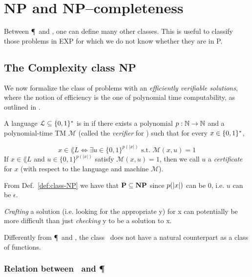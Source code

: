 \chapter{NP and NP--completeness}\label{ch:np-np-completeness}

Between \P~and \EXP, one can define many other classes. This is useful to classify those problems in EXP for which we do not know whether they are in P.

\section{The Complexity class NP}

We now formalize the class of problems with an \emph{efficiently verifiable solutions}, where the notion of efficiency is the one of polynomial time computability, as outlined in \chapref{\ref{ch:computational-model}}.
\begin{definition}
	A language $\mathcal{L} \subseteq \{ 0,1 \}^* $ is in \NP if there exists a polynomial $p : \mathbb{N} \to \mathbb{N}$ and a polynomial-time TM $\mathcal{M}$ (called the \emph{verifier} for ) such that for every $x \in \{ 0,1 \}^* $,

	\begin{equation}
		x \in \lang{L} \Leftrightarrow \exists u \in \{0,1\}^{p(|x|)} \text{ s.t. } \mathcal{M}(x,u) = 1
		\label{eq:NP-def}
	\end{equation}
	If $x \in \lang{L}$ and $u \in \{0,1\}^{p(|x|)}$ satisfy $\mathcal{M}(x,u) = 1$, then we call $u$ a \emph{certificate} for $x$ (with respect to the language  and machine $\mathcal{M}$).
	\label{def:class-NP}
\end{definition}

\begin{remark}
	From Def.~\ref{def:class-NP} we have that $\textbf{P} \subseteq \textbf{NP}$ since $p(\left \lvert x \right \rvert)$ can be $0$, i.e. $u$ can be $\epsilon$.
\end{remark}
\emph{Crafting} a solution (i.e. looking for the appropriate y) for x can potentially be more difficult than just \emph{checking} y to be a solution to x.\\
\begin{note}
	Differently from \P~and \EXP, the class \NP~does not have a natural counterpart as a class of functions.
\end{note}

\subsection{Relation between \NP~and \P}

